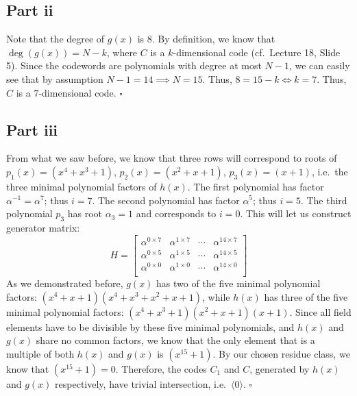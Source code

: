 \documentclass[letterpaper]{article}
\newcommand*{\QED}{\hfill\ensuremath{\square}}%
\begin{document}
\subsection{Part ii}
\label{subs:2Partii}

Note that the degree of $ g(x) $ is $ 8 $.
By definition, we know that $ \deg{(g(x))} = N - k $, where $ C $ is a $ k $-dimensional code (cf.\ Lecture 18, Slide 5).
Since the codewords are polynomials with degree at most $ N - 1 $, we can easily see that by assumption $ N - 1 = 14 \implies N = 15 $.
Thus, $ 8 = 15 - k \iff k = 7 $.
Thus, $ C $ is a $ 7 $-dimensional code.
\QED{}

\subsection{Part iii}
\label{subs:2Partiii}

From what we saw before, we know that three rows will correspond to roots of $ p_1(x) = (x^4 + x^3 + 1) $, $ p_2(x) = (x^2 + x + 1) $, $ p_3(x) = (x + 1) $, i.e.\ the three minimal polynomial factors of $ h(x) $.
The first polynomial has factor $ \alpha^{-1} = \alpha^7 $; thus $ i = 7 $.
The second polynomial has factor $ \alpha^{5} $; thus $ i = 5 $.
The third polynomial $ p_3 $ has root $ \alpha_3 = 1 $ and corresponds to $ i = 0 $.
This will let us construct generator matrix:
\[
H = \begin{bmatrix}
\alpha^{0 \times 7} & \alpha^{1 \times 7} & \cdots & \alpha^{14 \times 7} \\
\alpha^{0 \times 5} & \alpha^{1 \times 5} & \cdots & \alpha^{14 \times 5} \\
\alpha^{0 \times 0} & \alpha^{1 \times 0} & \cdots & \alpha^{14 \times 0} \\
\end{bmatrix}
\]
As we demonstrated before, $ g(x) $ has two of the five minimal polynomial factors: $ (x^4 + x + 1)(x^4 + x^3 + x^2 + x + 1) $, while $ h(x) $ has three of the five minimal polynomial factors: $ (x^4 + x^3 + 1)(x^2 + x + 1)(x + 1) $.
Since all field elements have to be divisible by these five minimal polynomials, and $ h(x) $ and $ g(x) $ share no common factors, we know that the only element that is a multiple of both $ h(x) $ and $ g(x) $ is $ (x^{15} + 1) $.
By our chosen residue class, we know that $ (x^{15} + 1) = 0 $.
Therefore, the codes $ C_1 $ and $ C $, generated by $ h(x) $ and $ g(x) $ respectively, have trivial intersection, i.e.\ $ \langle 0 \rangle $.
\QED{}

\section{}
\label{sec:Question3}
\end{document}
